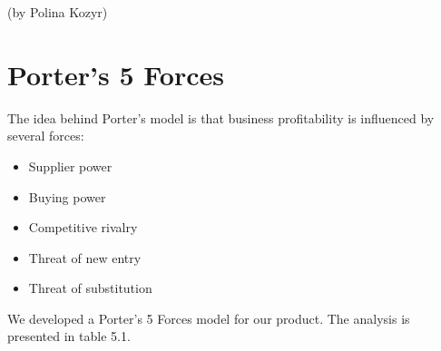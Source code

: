 (by Polina Kozyr)

\section{Porter's 5 Forces}

The idea behind Porter's model \cite{PorterFiveForces} is that business profitability is influenced by several forces:

\begin{itemize}
\item Supplier power
\item Buying power
\item Competitive rivalry
\item Threat of new entry 
\item Threat of substitution
\end{itemize}
We developed a Porter's 5 Forces model for our product. The analysis is presented in table 5.1.

